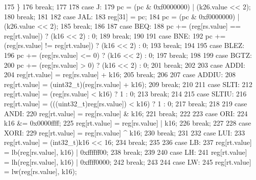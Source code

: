 \begin{DoxyCode}
{{175         \}
176         \textcolor{keywordflow}{break};
177 
178     \textcolor{keywordflow}{case} J:
179         pc = (pc & 0xf0000000) | (k26.value << 2);
180         \textcolor{keywordflow}{break};
181 
182     \textcolor{keywordflow}{case} JAL:
183         reg[31] = pc;
184         pc = (pc & 0xf0000000) | (k26.value << 2);
185         \textcolor{keywordflow}{break};
186 
187     \textcolor{keywordflow}{case} BEQ:
188         pc += (reg[rs.value] == reg[rt.value]) ? (k16 << 2) : 0;
189         \textcolor{keywordflow}{break};
190 
191     \textcolor{keywordflow}{case} BNE:
192         pc += (reg[rs.value] != reg[rt.value]) ? (k16 << 2) : 0;
193         \textcolor{keywordflow}{break};
194 
195     \textcolor{keywordflow}{case} BLEZ:
196         pc += (reg[rs.value] <= 0) ? (k16 << 2) : 0;
197         \textcolor{keywordflow}{break};
198 
199     \textcolor{keywordflow}{case} BGTZ:
200         pc += (reg[rs.value] > 0) ? (k16 << 2) : 0;
201         \textcolor{keywordflow}{break};
202 
203     \textcolor{keywordflow}{case} ADDI:
204         reg[rt.value] = reg[rs.value] + k16;
205         \textcolor{keywordflow}{break};
206 
207     \textcolor{keywordflow}{case} ADDIU:
208         reg[rt.value] = (uint32\_t)(reg[rs.value] + k16);
209         \textcolor{keywordflow}{break};
210 
211     \textcolor{keywordflow}{case} SLTI:
212         reg[rt.value] = (reg[rs.value] < k16) ? 1 : 0;
213         \textcolor{keywordflow}{break};
214 
215     \textcolor{keywordflow}{case} SLTIU:
216         reg[rt.value] = (((uint32\_t)reg[rs.value]) < k16) ? 1 : 0;
217         \textcolor{keywordflow}{break};
218 
219     \textcolor{keywordflow}{case} ANDI:
220         reg[rt.value] = reg[rs.value] & k16;
221         \textcolor{keywordflow}{break};
222 
223     \textcolor{keywordflow}{case} ORI:
224         k16 &= 0x0000ffff;
225         reg[rt.value] = reg[rs.value] | k16;
226         \textcolor{keywordflow}{break};
227 
228     \textcolor{keywordflow}{case} XORI:
229         reg[rt.value] = reg[rs.value] ^ k16;
230         \textcolor{keywordflow}{break};
231 
232     \textcolor{keywordflow}{case} LUI:
233         reg[rt.value] = (int32\_t)k16 << 16;
234         \textcolor{keywordflow}{break};
235 
236     \textcolor{keywordflow}{case} LB:
237         reg[rt.value] = lb(reg[rs.value], k16) | 0xffffff00;
238         \textcolor{keywordflow}{break};
239 
240     \textcolor{keywordflow}{case} LH:
241         reg[rt.value] = lh(reg[rs.value], k16) | 0xffff0000;
242         \textcolor{keywordflow}{break};
243 
244     \textcolor{keywordflow}{case} LW:
245         reg[rt.value] = lw(reg[rs.value], k16);
}}
\end{DoxyCode}
